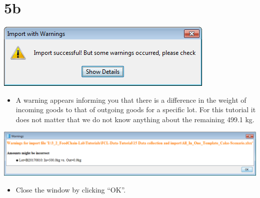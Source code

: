 \documentclass[10pt]{beamer}
\begin{document}
\section{5b}
\begin{frame}
	\begin{center}
			\includegraphics[scale=0.5]{5b.png}
	\end{center}
	\begin{itemize}
		\item A warning appears informing you that there is a difference in the weight of incoming goods to that of outgoing goods for a specific lot. For this tutorial it does not matter that we do not know anything about the remaining 499.1 kg.
	\end{itemize}
	\begin{center}
			\includegraphics[scale=0.375]{5c.png}
	\end{center}
	\begin{itemize}
		\item Close the window by clicking ``OK''.
	\end{itemize}
\end{frame}
\end{document}
